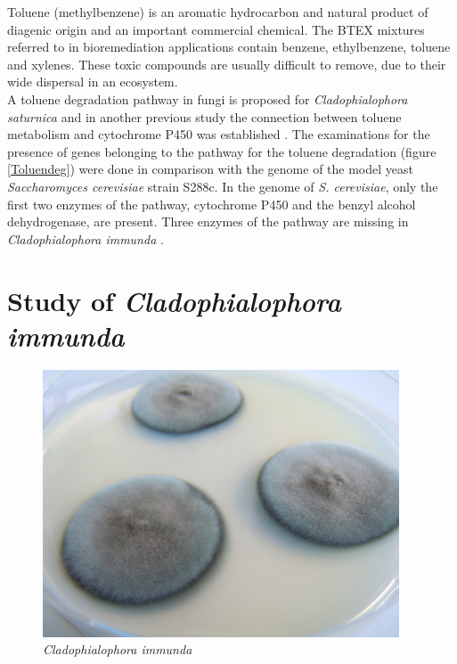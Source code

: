 \documentclass[12pt, a4paper]{report}
\begin{document}
Toluene (methylbenzene) is an aromatic hydrocarbon and natural product of diagenic origin and an important commercial chemical. The BTEX mixtures referred to in bioremediation applications contain benzene, ethylbenzene, toluene and xylenes. These toxic compounds are usually difficult to remove, due  to their wide dispersal in an ecosystem. 
\\
A toluene degradation pathway in fungi is proposed for \textit{Cladophialophora saturnica} \cite{Badali2008} and in another previous study the connection between toluene metabolism and cytochrome P450 was established \cite{Luykx2003}. The examinations for the presence of genes belonging to the pathway for the toluene degradation (figure \ref{Toluendeg}) were done in comparison with the genome of the model yeast \textit{Saccharomyces cerevisiae} strain S288c. In the genome of \textit{S. cerevisiae}, only the first two enzymes of the pathway, cytochrome P450 and the benzyl alcohol dehydrogenase, are present. Three enzymes of the pathway are missing in  \textit{Cladophialophora immunda} \cite{Blasi2016, Parales2008}. \\


\section{Study of \textit{Cladophialophora immunda}}\label{study}
 \begin{figure}[H]
 	\centering	
 	\includegraphics[width=300pt]{pics/cimmunda1.JPG}
 	\caption[\textit{Cladophialophora immunda}]
 	{\textit{Cladophialophora immunda}}
 \end{figure}
 
\end{document}
